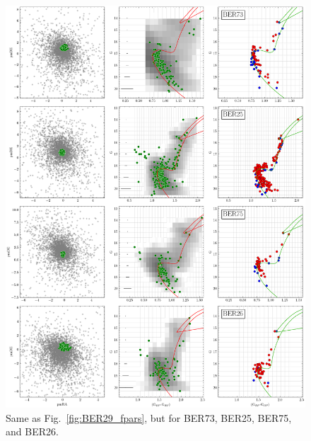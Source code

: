 \documentclass{aa}
\begin{document}
\begin{appendix}
 \begin{figure}[t]
  \centering
  \includegraphics[height=.95\textheight]{figs/0_fpars.png}
  \caption{Same as Fig.~\ref{fig:BER29_fpars}, but  for BER73, BER25, BER75, and BER26.}
  \label{fig:0fpars}
 \end{figure}


\end{appendix}
\end{document}
